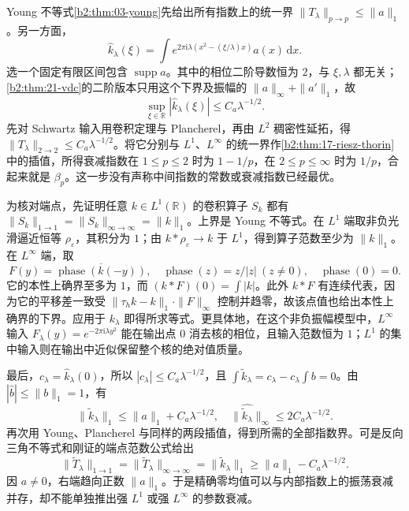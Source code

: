 \begin{solution}
Young 不等式\cref{b2:thm:03-young}先给出所有指数上的统一界 \(\|T_\lambda\|_{p\to p}\leq\|a\|_1\)。另一方面，
\[
 \widehat k_\lambda(\xi)
 =\int e^{2\pi\mathrm i\lambda(x^2-(\xi/\lambda)x)}a(x)\,\mathrm dx.
\]
选一个固定有限区间包含 \(\operatorname{supp}a\)。其中的相位二阶导数恒为 \(2\)，与 \(\xi,\lambda\) 都无关；\cref{b2:thm:21-vdc}的二阶版本只用这个下界及振幅的 \(\|a\|_\infty+\|a'\|_1\)，故
\[
 \sup_{\xi\in\mathbb R}|\widehat k_\lambda(\xi)|\leq C_a\lambda^{-1/2}.
\]
先对 Schwartz 输入用卷积定理与 Plancherel，再由 \(L^2\) 稠密性延拓，得 \(\|T_\lambda\|_{2\to2}\leq C_a\lambda^{-1/2}\)。将它分别与 \(L^1\)、\(L^\infty\) 的统一界作\cref{b2:thm:17-riesz-thorin}中的插值，所得衰减指数在 \(1\leq p\leq2\) 时为 \(1-1/p\)，在 \(2\leq p\leq\infty\) 时为 \(1/p\)，合起来就是 \(\beta_p\)。这一步没有声称中间指数的常数或衰减指数已经最优。

为核对端点，先证明任意 \(k\in L^1(\mathbb R)\) 的卷积算子 \(S_k\) 都有
\(\|S_k\|_{1\to1}=\|S_k\|_{\infty\to\infty}=\|k\|_1\)。上界是 Young 不等式。在 \(L^1\) 端取非负光滑逼近恒等 \(\rho_\varepsilon\)，其积分为 \(1\)；由 \(k*\rho_\varepsilon\to k\) 于 \(L^1\)，得到算子范数至少为 \(\|k\|_1\)。在 \(L^\infty\) 端，取
\[
 F(y)=\overline{\operatorname{phase}(k(-y))},\quad
 \operatorname{phase}(z)=z/|z|\ (z\ne0),\quad \operatorname{phase}(0)=0.
\]
它的本性上确界至多为 \(1\)，而 \((k*F)(0)=\int|k|\)。此外 \(k*F\) 有连续代表，因为它的平移差一致受 \(\|\tau_hk-k\|_1\cdot\|F\|_\infty\) 控制并趋零，故该点值也给出本性上确界的下界。应用于 \(k_\lambda\) 即得所求等式。更具体地，在这个非负振幅模型中，\(L^\infty\) 输入 \(F_\lambda(y)=e^{-2\pi\mathrm i\lambda y^2}\) 能在输出点 \(0\) 消去核的相位，且输入范数恒为 \(1\)；\(L^1\) 的集中输入则在输出中近似保留整个核的绝对值质量。

最后，\(c_\lambda=\widehat k_\lambda(0)\)，所以 \(|c_\lambda|\leq C_a\lambda^{-1/2}\)，且 \(\int\widetilde k_\lambda=c_\lambda-c_\lambda\int b=0\)。由 \(|\widehat b|\leq\|b\|_1=1\)，有
\[
 \|\widetilde k_\lambda\|_1\leq\|a\|_1+C_a\lambda^{-1/2},\quad
 \|\widehat{\widetilde k_\lambda}\|_\infty
 \leq2C_a\lambda^{-1/2}.
\]
再次用 Young、Plancherel 与同样的两段插值，得到所需的全部指数界。可是反向三角不等式和刚证的端点范数公式给出
\[
 \|\widetilde T_\lambda\|_{1\to1}
 =\|\widetilde T_\lambda\|_{\infty\to\infty}
 =\|\widetilde k_\lambda\|_1
 \geq\|a\|_1-C_a\lambda^{-1/2}.
\]
因 \(a\ne0\)，右端趋向正数 \(\|a\|_1\)。于是精确零均值可以与内部指数上的振荡衰减并存，却不能单独推出强 \(L^1\) 或强 \(L^\infty\) 的参数衰减。
\end{solution}

